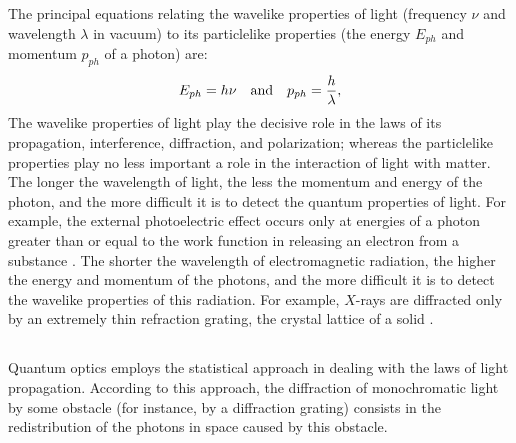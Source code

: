 \subsection{}\label{37.4.2} The principal equations relating the wavelike properties of light (frequency $\nu$ and wavelength $\lambda$ in vacuum) to its particlelike properties (the energy $E_{ph}$ and momentum $p_{ph}$ of a photon) are:
\begin{equation*}%
E_{ph} =h\nu \qand p_{ph}= \frac{h}{\lambda},
\end{equation*}
The wavelike properties of light play the decisive role in the laws of its propagation, interference, diffraction, and polarization; whereas the particlelike properties play no less important a role in the interaction of light with matter. The longer the wavelength of light, the less the momentum and energy of the photon, and the more difficult it is to detect the quantum properties of light. For example, the external photoelectric effect occurs only at energies of a photon greater than or equal to the work function in releasing an electron from a substance . The shorter the wavelength of electromagnetic radiation, the higher the energy and momentum of the photons, and the more difficult it is to detect the wavelike properties of this radiation. For example, $X$-rays are diffracted only by an extremely thin refraction grating, the crystal lattice of a solid .

\subsection{}\label{37.4.3} Quantum optics employs the statistical approach in dealing with the laws of light propagation. According to this approach, the diffraction of monochromatic light by some obstacle (for instance, by a diffraction grating) consists in the redistribution
of the photons in space caused by this obstacle.

